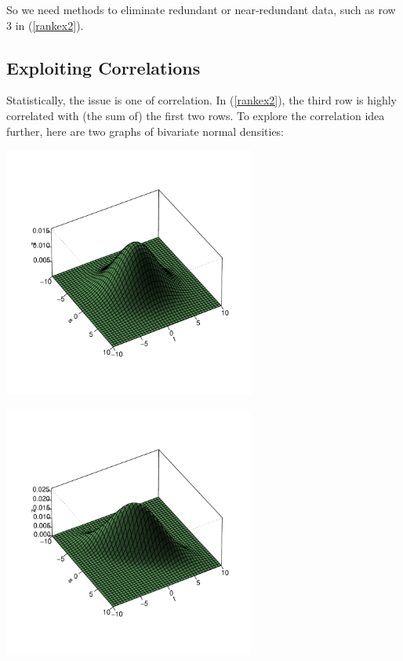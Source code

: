 So we need methods to eliminate redundant or near-redundant data, such
as row 3 in (\ref{rankex2}).

\subsection{Exploiting Correlations}
\label{explorecorr}

Statistically, the issue is one of correlation.  In (\ref{rankex2}), the
third row is highly correlated with (the sum of) the first two rows.  To
explore the correlation idea further, here are two graphs of bivariate
normal densities:

\begin{minipage}[b]{0.65\linewidth}
    \mbox{\includegraphics[width=3.25in]{Images/Rho2.pdf}} 
\end{minipage}
\hspace{0.0in}
\begin{minipage}[b]{0.65\linewidth}
    \mbox{\includegraphics[width=3.25in]{Images/Rho8.pdf}} 
\end{minipage}

